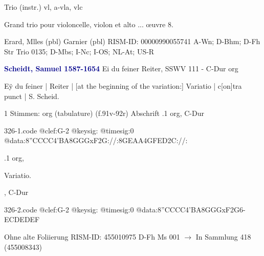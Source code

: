 \documentclass[twocolumn]{book}
\begin{document}
\newline Trio (instr.)
\newline vl, a-vla, vlc
\newline \begin{itshape}Grand trio pour violoncelle, violon et alto ... œuvre 8.\end{itshape} 
\newline Erard, Mlles  (pbl)
\newline Garnier  (pbl)
\newline RISM-ID: 00000990055741
\newline A-Wn; D-Bhm; D-Fh  Str Trio 0135; D-Mbs; I-Nc; I-OS; NL-At; US-R
\newline \par \vspace{7pt} \textcolor{darkblue}{\textbf{Scheidt, Samuel  1587-1654}}
\newline Ei du feiner Reiter, SSWV 111 - C-Dur
\newline org
\newline \begin{itshape}[f.91v, at left:] Eÿ du feiner | Reiter | [at the beginning of the variation:] Variatio | c[on]tra punct | S. Scheid.\end{itshape} 
\newline \textcolor{darkblue}{}  1 Stimmen: org (tabulature)  (f.91v-92r)
\newline Abschrift
.1  org, C-Dur  
\begin{filecontents*}{326-1.code}
@clef:G-2
@keysig:
@timesig:0
@data:8''CCCC4'BA8GGGxF2G://:8GEAA4GFED2C://:
\end{filecontents*}
\newline
%
.1  org, \begin{itshape}Variatio.\end{itshape}, C-Dur  
\begin{filecontents*}{326-2.code}
@clef:G-2
@keysig:
@timesig:0
@data:8''CCCC4'BA8GGGxF2G6-{ECD}{EDEF}
\end{filecontents*}
\newline
%
\newline Ohne alte Foliierung
\newline RISM-ID: 455010975
\newline D-Fh  Ms 001
\newline $\rightarrow$ In Sammlung 418 (455008343)
      
\end{document}
